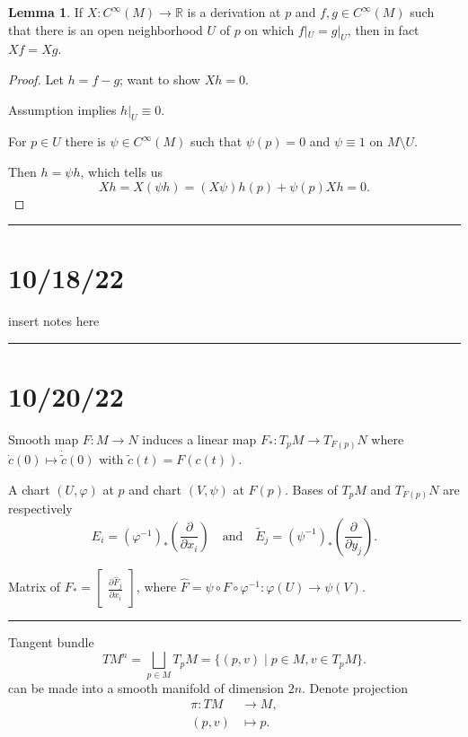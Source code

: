 \documentclass[12pt]{article}
\newcommand{\sepline}{\rule{\textwidth}{0.4pt}}
\theoremstyle{definition}
\newtheorem{lemma}{Lemma}
\newcommand{\isp}[1]{\quad\text{#1}\quad}
\newcommand{\R}{\mathbb{R}}
\renewcommand{\phi}{\varphi}
\newcommand{\<}{\left\langle}
\renewcommand{\>}{\right\rangle}
\newcommand{\To}{\longrightarrow}
\newcommand{\Mapsto}{\longmapsto}
\newcommand{\pdv}[2]{\frac{\partial #1}{\partial #2}}
\newcommand{\mat}[1]{\begin{bmatrix}#1\end{bmatrix}}
\renewcommand{\hat}{\widehat}
\renewcommand{\tilde}{\widetilde}
\begin{document}
\begin{lemma}
    If $X : C^\infty(M) \to \R$ is a derivation at $p$ and $f, g \in C^\infty(M)$ such that there is an open neighborhood $U$ of $p$ on which $f|_U = g|_U$, then in fact $Xf = Xg$.
\end{lemma}

\begin{proof}
    Let $h = f - g$; want to show $Xh = 0$.

    Assumption implies $h|_U \equiv 0$.

    For $p \in U$ there is $\psi \in C^\infty(M)$ such that $\psi(p) = 0$ and $\psi \equiv 1$ on $M \setminus U$.

    Then $h = \psi h$, which tells us
    \[
        Xh
            = X(\psi h)
            = (X\psi)h(p) + \psi(p) Xh
            = 0.  
    \]
\end{proof}


\sepline

\section*{10/18/22}

insert notes here

\sepline

\section*{10/20/22}

Smooth map $F : M \to N$ induces a linear map $F_* : T_pM \to T_{F(p)}N$ where $\dot{c}(0) \mapsto \dot{\tilde{c}}(0)$ with $\tilde{c}(t) = F(c(t))$.

A chart $(U, \phi)$ at $p$ and chart $(V, \psi)$ at $F(p)$.
Bases of $T_pM$ and $T_{F(p)}N$ are respectively
\[\textstyle
    E_i = (\phi^{-1})_*(\pdv{}{x_i})
    \isp{and}
    \tilde{E}_j = (\psi^{-1})_*(\pdv{}{y_j}).
\]

Matrix of $F_* = \mat{\pdv{\hat{F}_j}{x_i}}$, where $\hat{F} = \psi \circ F \circ \phi^{-1} : \phi(U) \to \psi(V)$.

\sepline

Tangent bundle 
\[
    TM^n
        = \bigsqcup_{p \in M} T_pM
        = \{(p, v) \mid p \in M, v \in T_pM\}.
\]
can be made into a smooth manifold of dimension $2n$.
Denote projection
\begin{align*}
    \pi : TM &\To M, \\
        (p, v) &\Mapsto p.
\end{align*}
\end{document}

